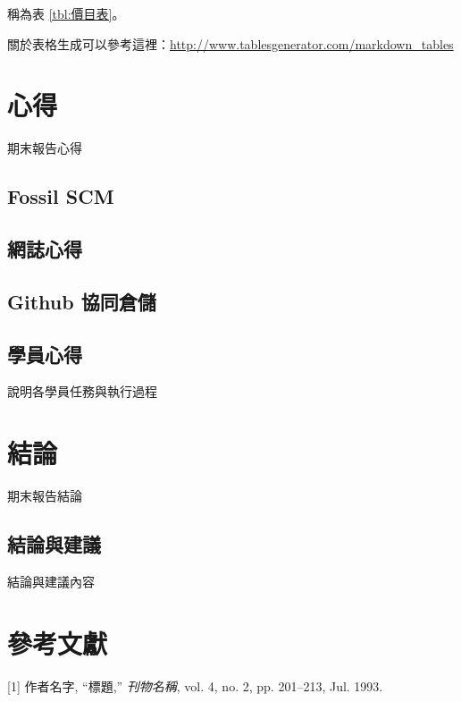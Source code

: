 \documentclass[12pt,,]{report}
\begin{document}
稱為表 \ref{tbl:價目表}。

關於表格生成可以參考這裡：\url{http://www.tablesgenerator.com/markdown_tables}

\hypertarget{ux5fc3ux5f97}{%
\chapter{心得}\label{ux5fc3ux5f97}}

期末報告心得

\hypertarget{fossil-scm}{%
\section{Fossil SCM}\label{fossil-scm}}

\hypertarget{ux7db2ux8a8cux5fc3ux5f97}{%
\section{網誌心得}\label{ux7db2ux8a8cux5fc3ux5f97}}

\hypertarget{github-ux5354ux540cux5009ux5132}{%
\section{Github 協同倉儲}\label{github-ux5354ux540cux5009ux5132}}

\hypertarget{ux5b78ux54e1ux5fc3ux5f97}{%
\section{學員心得}\label{ux5b78ux54e1ux5fc3ux5f97}}

說明各學員任務與執行過程

\hypertarget{ux7d50ux8ad6}{%
\chapter{結論}\label{ux7d50ux8ad6}}

期末報告結論

\hypertarget{ux7d50ux8ad6ux8207ux5efaux8b70}{%
\section{結論與建議}\label{ux7d50ux8ad6ux8207ux5efaux8b70}}

結論與建議內容

\hypertarget{ux53c3ux8003ux6587ux737b}{%
\chapter*{參考文獻}\label{ux53c3ux8003ux6587ux737b}}

\hypertarget{refs}{}
\leavevmode\hypertarget{ref-myart}{}%
{[}1{]} 作者名字, ``標題,'' \emph{刊物名稱}, vol. 4, no. 2, pp.
201--213, Jul. 1993.
\end{document}
